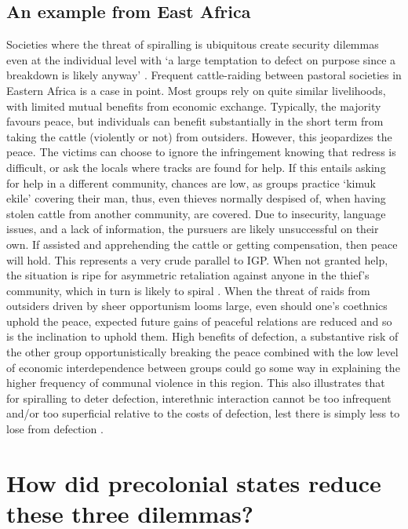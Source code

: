 \documentclass[12pt]{article}
\begin{document}
\subsection{An example from East Africa}

Societies where the threat of spiralling is ubiquitous create security dilemmas
even at the individual level with ‘a large temptation to defect on purpose since
a breakdown is likely anyway’ \citep[724]{Fearon_1996}. Frequent cattle-raiding
between pastoral societies in Eastern Africa is a case in point.  Most groups
rely on quite similar livelihoods, with limited mutual benefits from economic
exchange. Typically, the majority favours peace, but individuals can benefit
substantially in the short term from taking the cattle (violently or not) from
outsiders. However, this jeopardizes the peace. The victims can choose to ignore
the infringement knowing that redress is difficult, or ask the locals where
tracks are found for help. If this entails asking for help in a different
community, chances are low, as groups practice ‘kimuk ekile’ covering their man,
thus, even thieves normally despised of, when having stolen cattle from another
community, are covered. Due to insecurity, language issues, and a lack of
information, the pursuers are likely unsuccessful on their own. If assisted and
apprehending the cattle or getting compensation, then peace will hold. This
represents a very crude parallel to IGP. When not granted help, the situation is
ripe for asymmetric retaliation against anyone in the thief’s community, which
in turn is likely to spiral \citep[104ff]{Eaton_2008}. When the threat of raids
from outsiders driven by sheer opportunism looms large, even should one’s
coethnics uphold the peace, expected future gains of peaceful relations are
reduced and so is the inclination to uphold them. High benefits of defection, a
substantive risk of the other group opportunistically breaking the peace
combined with the low level of economic interdependence between groups could go
some way in explaining the higher frequency of communal violence in this region.
This also illustrates that for spiralling to deter defection, interethnic
interaction cannot be too infrequent and/or too superficial relative to the
costs of defection, lest there is simply less to lose from defection
\citep{Fearon_1996}. 


\section{How did precolonial states reduce these three dilemmas?}
\end{document}
